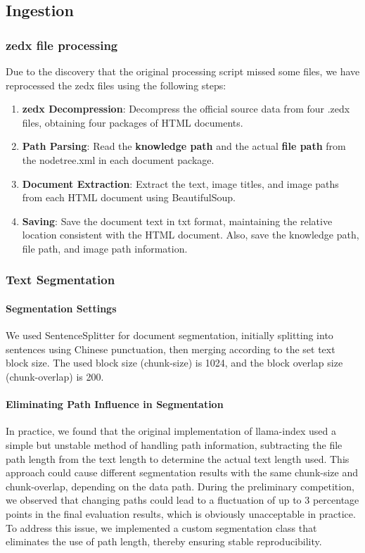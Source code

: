 \documentclass[11pt]{article}
\begin{document}
\subsection{Ingestion}\label{sec:ingestion}
\subsubsection{zedx file processing}
Due to the discovery that the original processing script missed some files, we have reprocessed the zedx files using the following steps:

\begin{enumerate}
    \item \textbf{zedx Decompression}: Decompress the official source data from four .zedx files, obtaining four packages of HTML documents.
    \item \textbf{Path Parsing}: Read the \textbf{knowledge path} and the actual \textbf{file path} from the nodetree.xml in each document package.
    \item \textbf{Document Extraction}: Extract the text, image titles, and image paths from each HTML document using BeautifulSoup.
    \item \textbf{Saving}: Save the document text in txt format, maintaining the relative location consistent with the HTML document. Also, save the knowledge path, file path, and image path information.
\end{enumerate}

\subsubsection{Text Segmentation}
\paragraph{Segmentation Settings} We used SentenceSplitter for document segmentation, initially splitting into sentences using Chinese punctuation, then merging according to the set text block size. The used block size (chunk-size) is 1024, and the block overlap size (chunk-overlap) is 200.

\paragraph{Eliminating Path Influence in Segmentation} In practice, we found that the original implementation of llama-index used a simple but unstable method of handling path information, subtracting the file path length from the text length to determine the actual text length used. This approach could cause different segmentation results with the same chunk-size and chunk-overlap, depending on the data path. During the preliminary competition, we observed that changing paths could lead to a fluctuation of up to 3 percentage points in the final evaluation results, which is obviously unacceptable in practice. To address this issue, we implemented a custom segmentation class that eliminates the use of path length, thereby ensuring stable reproducibility.
\end{document}
